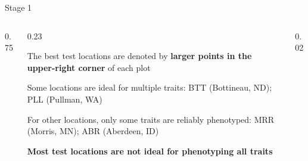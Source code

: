 \documentclass[final]{beamer}
\newlength{\twocolwid}
\begin{document}
\begin{frame}[t]
\begin{columns}[t]
\begin{column}{\twocolwid}
\begin{block}{Stage 1}

\vspace{0.5cm}



\begin{columns}[t,totalwidth=\twocolwid] %


\begin{column}{0.75\twocolwid}


\end{column}


\begin{column}{0.23\twocolwid}

The best test locations are denoted by \textbf{larger points in the upper-right corner} of each plot

\vspace{1cm}


Some locations are ideal for multiple traits: BTT (Bottineau, ND); PLL (Pullman, WA)

\vspace{1cm}

For other locations, only some traits are reliably phenotyped: MRR (Morris, MN); ABR (Aberdeen, ID)

\vspace{1cm}

\textbf{Most test locations are not ideal for phenotyping all traits}

\end{column}


\begin{column}{0.02\twocolwid}
\end{column}


\end{columns}
\end{block}
\end{column}
\end{columns}
\end{frame}
\end{document}
